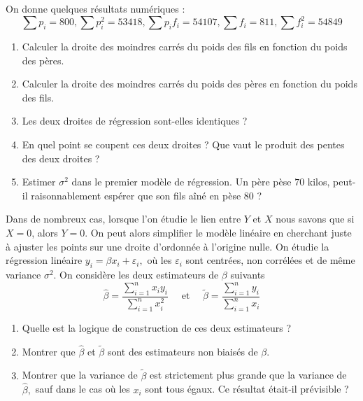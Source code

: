 \documentclass{td_um}
\providecommand{\1}{\mathds{1}}
\begin{document}
	On donne quelques résultats numériques :
	$$
	\sum p_{i}=800, \sum p_{i}^{2}=53418, \sum p_{i} f_{i}=54107, \sum f_{i}=811, \sum f_{i}^{2}=54849
	$$
	\begin{enumerate}
		\item  Calculer la droite des moindres carrés du poids des fils en fonction du poids des pères.
		\item  Calculer la droite des moindres carrés du poids des pères en fonction du poids des fils.
		\item  Les deux droites de régression sont-elles identiques ?
		\item  En quel point se coupent ces deux droites ? Que vaut le produit des pentes des deux droites ?
		\item  Estimer $\sigma^{2}$ dans le premier modèle de régression. Un père pèse $70$ kilos, peut-il raisonnablement espérer que son fils aîné en pèse $80$ ?
	\end{enumerate}
	
	
	\cor{\newpage}
	
	\exo{}
	Dans de nombreux cas, lorsque l'on étudie le lien entre $Y$ et $X$ nous savons que si $X=0$, alors $Y=0$. On peut alors simplifier le modèle linéaire en cherchant juste à ajuster les points sur une droite d'ordonnée à l'origine nulle. On étudie la régression linéaire $y_{i}=\beta x_{i}+\varepsilon_{i},$ où les $\varepsilon_{i}$ sont centrées, non corrélées et de même variance $\sigma^{2}$. On considère les deux estimateurs de $\beta$ suivants
	\[
	\hat{\beta}=\frac{\sum_{i=1}^{n} x_{i} y_{i}}{\sum_{i=1}^{n} x_{i}^{2}} \quad \text { et } \quad \tilde{\beta}=\frac{\sum_{i=1}^{n} y_{i}}{\sum_{i=1}^{n} x_{i}}
	\]
	\begin{enumerate}
		\item  Quelle est la logique de construction de ces deux estimateurs ?
		\item   Montrer que $\hat{\beta}$ et $\tilde{\beta}$ sont des estimateurs non biaisés de $\beta$.
		\item   Montrer que la variance de $\tilde{\beta}$ est strictement plus grande que la variance de
		$\hat{\beta},$ sauf dans le cas où les $x_{i}$ sont tous égaux. Ce résultat était-il prévisible ?
	\end{enumerate}
	
\end{document}
